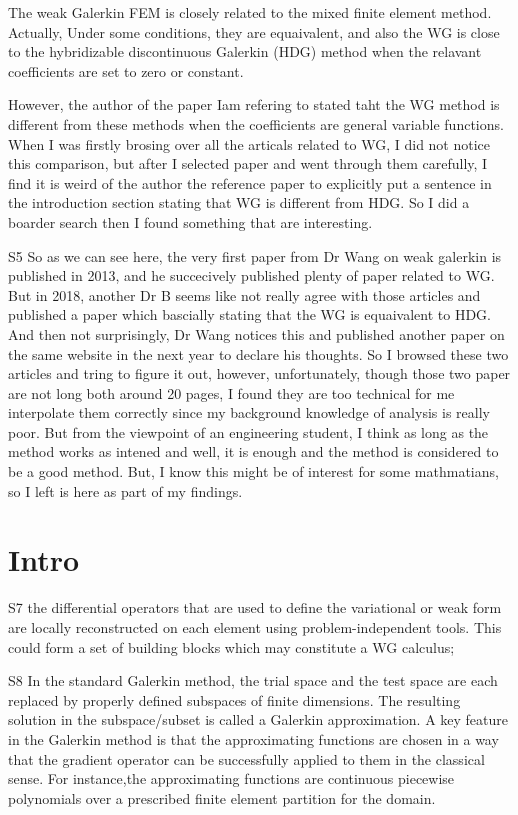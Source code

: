 \documentclass[17pt]{extarticle} %
\begin{document}
The weak Galerkin FEM is closely related to the mixed finite element method. Actually, Under some conditions, 
they are equaivalent, and also the WG is close to the hybridizable discontinuous
Galerkin (HDG) method when the relavant coefficients are set to zero or constant. 

However, 
the author of the paper Iam refering to stated taht the WG method is different from these methods when the coefficients are general variable functions.
When I was firstly brosing over all the articals related to WG, I did not notice this comparison, but after I selected
paper and went through them carefully, I find it is weird of the author the reference paper to explicitly put a sentence in
the introduction section stating that WG is different from HDG. So I did a boarder search then I found something that are 
interesting. 

S5
So as we can see here, the very first paper from Dr Wang on weak galerkin is published in 2013, and he succecively published 
plenty of paper related to WG. But in 2018, another Dr B seems like not really agree with those articles and published a paper
which bascially stating that the WG is equaivalent to HDG. And then not surprisingly, Dr Wang notices this and published another
paper on the same website in the next year to declare his thoughts. So I browsed these two articles and tring to figure it out, however, unfortunately,
though those two paper are not long both around 20 pages, I found they are too technical for me interpolate them correctly since my
background knowledge of analysis is really poor. But from the viewpoint of an engineering student, I think as long as the method 
works as intened and well, it is enough and the method is considered to be a good method. But, I know this might be of interest
for some mathmatians, so I left is here as part of my findings.


\section*{Intro}

S7
the differential operators that are used to define the variational or weak form are locally reconstructed on each element using
problem-independent tools. This could form a set of building blocks which may
constitute a WG calculus;

S8
In the standard Galerkin method, the trial space and the test space are each replaced by properly 
defined subspaces of finite dimensions. The resulting solution in the subspace/subset is
called a Galerkin approximation. A key feature in the Galerkin method is that the approximating 
functions are chosen in a way that the gradient operator can be successfully applied to them 
in the classical sense. For instance,the approximating functions are continuous piecewise polynomials 
over a prescribed finite element partition for the domain. 
\end{document}
